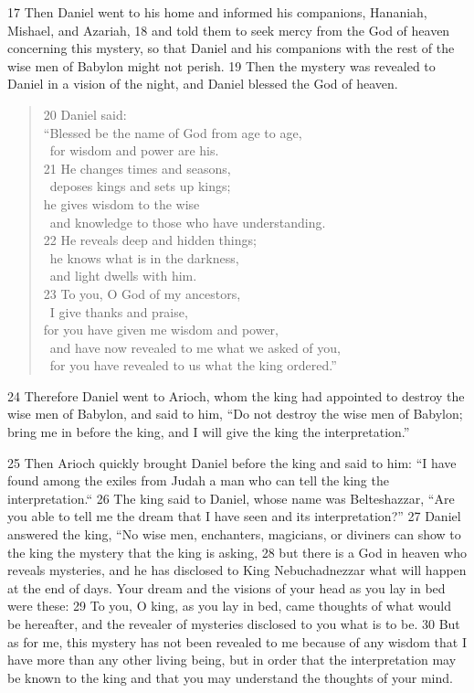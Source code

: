 17 Then Daniel went to his home and informed his companions, Hananiah, Mishael, 
and Azariah, 18 and told them to seek mercy from the God of heaven concerning 
this mystery, so that Daniel and his companions with the rest of the wise men 
of Babylon might not perish. 19 Then the mystery was revealed to Daniel in a 
vision of the night, and Daniel blessed the God of heaven.

\begin{verse}
20 Daniel said: \\
``Blessed be the name of God from age to age, \\
\vgap~for wisdom and power are his. \\
21 He changes times and seasons, \\
\vgap~deposes kings and sets up kings; \\
he gives wisdom to the wise \\
\vgap~and knowledge to those who have understanding. \\
22 He reveals deep and hidden things; \\
\vgap~he knows what is in the darkness, \\
\vgap~and light dwells with him. \\
23 To you, O God of my ancestors, \\
\vgap~I give thanks and praise, \\
for you have given me wisdom and power, \\
\vgap~and have now revealed to me what we asked of you, \\
\vgap~for you have revealed to us what the king ordered.'' \\
\end{verse}

24 Therefore Daniel went to Arioch, whom the king had appointed to destroy the 
wise men of Babylon, and said to him, ``Do not destroy the wise men of Babylon; 
bring me in before the king, and I will give the king the interpretation.''

25 Then Arioch quickly brought Daniel before the king and said to him: ``I have 
found among the exiles from Judah a man who can tell the king the 
interpretation.`` 26 The king said to Daniel, whose name was Belteshazzar, ``Are 
you able to tell me the dream that I have seen and its interpretation?'' 27 
Daniel answered the king, ``No wise men, enchanters, magicians, or diviners can 
show to the king the mystery that the king is asking, 28 but there is a God in 
heaven who reveals mysteries, and he has disclosed to King Nebuchadnezzar what 
will happen at the end of days. Your dream and the visions of your head as you 
lay in bed were these: 29 To you, O king, as you lay in bed, came thoughts of 
what would be hereafter, and the revealer of mysteries disclosed to you what is 
to be. 30 But as for me, this mystery has not been revealed to me because of any 
wisdom that I have more than any other living being, but in order that the 
interpretation may be known to the king and that you may understand the 
thoughts of your mind.

